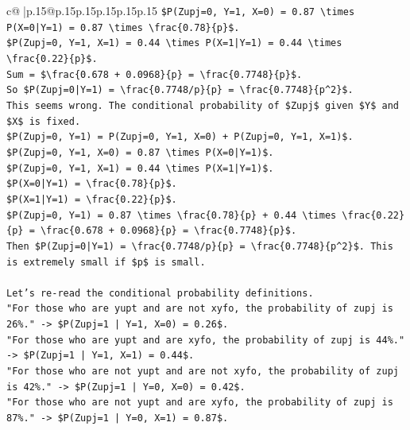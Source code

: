 \documentclass{article}
\begin{document}
{\begin{supertabular}{c@{$\;$}|p{.15\linewidth}@{}p{.15\linewidth}p{.15\linewidth}p{.15\linewidth}p{.15\linewidth}p{.15\linewidth}}
{{{\texttt{\$P(Zupj=0, Y=1, X=0) = 0.87 \textbackslash{}times P(X=0|Y=1) = 0.87 \textbackslash{}times \textbackslash{}frac\{0.78\}\{p\}\$.} \\
\texttt{\$P(Zupj=0, Y=1, X=1) = 0.44 \textbackslash{}times P(X=1|Y=1) = 0.44 \textbackslash{}times \textbackslash{}frac\{0.22\}\{p\}\$.} \\
\texttt{Sum = \$\textbackslash{}frac\{0.678 + 0.0968\}\{p\} = \textbackslash{}frac\{0.7748\}\{p\}\$.} \\
\texttt{So \$P(Zupj=0|Y=1) = \textbackslash{}frac\{0.7748/p\}\{p\} = \textbackslash{}frac\{0.7748\}\{p\^{}2\}\$.} \\
\texttt{This seems wrong. The conditional probability of \$Zupj\$ given \$Y\$ and \$X\$ is fixed.} \\
\texttt{\$P(Zupj=0, Y=1) = P(Zupj=0, Y=1, X=0) + P(Zupj=0, Y=1, X=1)\$.} \\
\texttt{\$P(Zupj=0, Y=1, X=0) = 0.87 \textbackslash{}times P(X=0|Y=1)\$.} \\
\texttt{\$P(Zupj=0, Y=1, X=1) = 0.44 \textbackslash{}times P(X=1|Y=1)\$.} \\
\texttt{\$P(X=0|Y=1) = \textbackslash{}frac\{0.78\}\{p\}\$.} \\
\texttt{\$P(X=1|Y=1) = \textbackslash{}frac\{0.22\}\{p\}\$.} \\
\texttt{\$P(Zupj=0, Y=1) = 0.87 \textbackslash{}times \textbackslash{}frac\{0.78\}\{p\} + 0.44 \textbackslash{}times \textbackslash{}frac\{0.22\}\{p\} = \textbackslash{}frac\{0.678 + 0.0968\}\{p\} = \textbackslash{}frac\{0.7748\}\{p\}\$.} \\
\texttt{Then \$P(Zupj=0|Y=1) = \textbackslash{}frac\{0.7748/p\}\{p\} = \textbackslash{}frac\{0.7748\}\{p\^{}2\}\$. This is extremely small if \$p\$ is small.} \\
\\ 
\texttt{Let's re{-}read the conditional probability definitions.} \\
\texttt{"For those who are yupt and are not xyfo, the probability of zupj is 26\%." {-}> \$P(Zupj=1 | Y=1, X=0) = 0.26\$.} \\
\texttt{"For those who are yupt and are xyfo, the probability of zupj is 44\%." {-}> \$P(Zupj=1 | Y=1, X=1) = 0.44\$.} \\
\texttt{"For those who are not yupt and are not xyfo, the probability of zupj is 42\%." {-}> \$P(Zupj=1 | Y=0, X=0) = 0.42\$.} \\
\texttt{"For those who are not yupt and are xyfo, the probability of zupj is 87\%." {-}> \$P(Zupj=1 | Y=0, X=1) = 0.87\$.} \\
}}}
\end{supertabular}}
\end{document}
